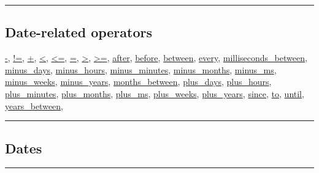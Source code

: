 \documentclass[]{book}
\theoremstyle{definition}
\theoremstyle{definition}
\theoremstyle{definition}
\theoremstyle{remark}
\begin{document}
\begin{center}\rule{0.5\linewidth}{\linethickness}\end{center}

\subsection{Date-related operators}\label{date-related-operators}

\href{operators-a-to-a.html\#-}{-},
\href{operators-a-to-a.html\#!=}{!=},
\href{operators-a-to-a.html\#+}{+},
\href{operators-a-to-a.html\#\%3C}{\textless{}},
\href{operators-a-to-a.html\#\%3C=}{\textless{}=},
\href{operators-a-to-a.html\#=}{=},
\href{operators-a-to-a.html\#\%3E}{\textgreater{}},
\href{operators-a-to-a.html\#\%3E=}{\textgreater{}=},
\href{operators-a-to-a.html\#after}{after},
\href{operators-b-to-c.html\#before}{before},
\href{operators-b-to-c.html\#between}{between},
\href{operators-d-to-h.html\#every}{every},
\href{operators-i-to-m.html\#milliseconds_between}{milliseconds\_between},
\href{operators-i-to-m.html\#minus_days}{minus\_days},
\href{operators-i-to-m.html\#minus_hours}{minus\_hours},
\href{operators-i-to-m.html\#minus_minutes}{minus\_minutes},
\href{operators-i-to-m.html\#minus_months}{minus\_months},
\href{operators-i-to-m.html\#minus_ms}{minus\_ms},
\href{operators-i-to-m.html\#minus_weeks}{minus\_weeks},
\href{operators-i-to-m.html\#minus_years}{minus\_years},
\href{operators-i-to-m.html\#months_between}{months\_between},
\href{operators-n-to-r.html\#plus_days}{plus\_days},
\href{operators-n-to-r.html\#plus_hours}{plus\_hours},
\href{operators-n-to-r.html\#plus_minutes}{plus\_minutes},
\href{operators-n-to-r.html\#plus_months}{plus\_months},
\href{operators-n-to-r.html\#plus_ms}{plus\_ms},
\href{operators-n-to-r.html\#plus_weeks}{plus\_weeks},
\href{operators-n-to-r.html\#plus_years}{plus\_years},
\href{operators-s-to-z.html\#since}{since},
\href{operators-s-to-z.html\#to}{to},
\href{operators-s-to-z.html\#until}{until},
\href{operators-s-to-z.html\#years_between}{years\_between},

\begin{center}\rule{0.5\linewidth}{\linethickness}\end{center}

\subsection{Dates}\label{dates}

\begin{center}\rule{0.5\linewidth}{\linethickness}\end{center}
\end{document}
